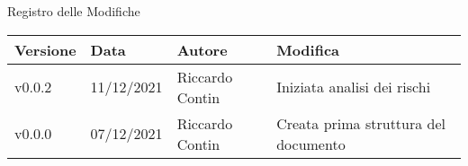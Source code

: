 \begin{center}
  \huge{Registro delle Modifiche}
\end{center}

\begin{center}
  \begin{tabular}{|p{2cm}|p{2cm}|p{3cm}|p{5cm}|}
    \hline
    \textbf{Versione} & \textbf{Data} & \textbf{Autore} & \textbf{Modifica}                    \\ \hline
    v0.0.2            & 11/12/2021    & Riccardo Contin & Iniziata analisi dei rischi          \\ \hline
    v0.0.0            & 07/12/2021    & Riccardo Contin & Creata prima struttura del documento \\ \hline
  \end{tabular}
\end{center}
